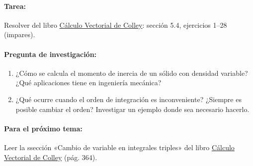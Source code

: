 \documentclass[a4,11pt]{aleph-notas}
\begin{document}
\paragraph{Tarea:}
Resolver del libro \href{https://catalogobiblioteca.puce.edu.ec/cgi-bin/koha/opac-detail.pl?biblionumber=83405&query_desc=su%3A%22An%C3%A1lisis%20vectorial%22}{Cálculo Vectorial de Colley}: sección 5.4, ejercicios 1--28 (impares).

\paragraph{Pregunta de investigación:}
\begin{enumerate}[leftmargin=*]
    \item ¿Cómo se calcula el momento de inercia de un sólido con densidad variable? ¿Qué aplicaciones tiene en ingeniería mecánica?
    \item ¿Qué ocurre cuando el orden de integración es inconveniente? ¿Siempre es posible cambiar el orden? Investigar un ejemplo donde sea necesario hacerlo.
\end{enumerate}

\paragraph{Para el próximo tema:}
Leer la ssección «Cambio de variable en integrales triples» del libro \href{https://catalogobiblioteca.puce.edu.ec/cgi-bin/koha/opac-detail.pl?biblionumber=83405&query_desc=su%3A%22An%C3%A1lisis%20vectorial%22}{Cálculo Vectorial de Colley} (pág. 364).
\end{document}
